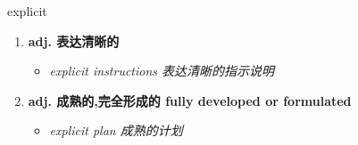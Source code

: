 
\begin{frame}
{\huge explicit}
\begin{center}
\begin{enumerate}\Large
  \item \textbf{adj. 表达清晰的}
  \begin{itemize}
    \item \em{\Large{explicit instructions 表达清晰的指示说明}}
  \end{itemize}
  \item \textbf{adj. 成熟的,完全形成的 fully developed or formulated}
  \begin{itemize}
    \item \em{\Large{explicit plan 成熟的计划}}
  \end{itemize}
\end{enumerate}
\end{center}
\end{frame}
